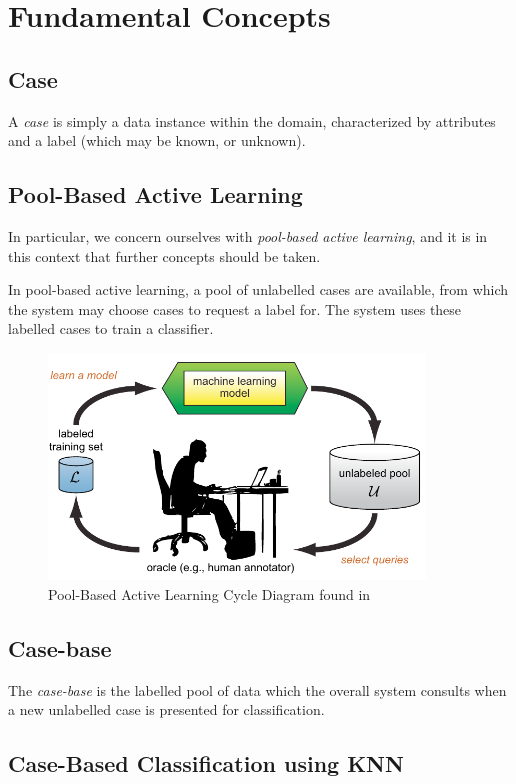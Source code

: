 \documentclass[a4paper,11pt]{report}
\begin{document}
\section{Fundamental Concepts}
\subsection{Case}
A \emph{case} is simply a data instance within the domain, characterized by attributes and a label (which may be known, or unknown).

\subsection{Pool-Based Active Learning}
In particular, we concern ourselves with \emph{pool-based active learning}, and it is in this context that further concepts should be taken.

In pool-based active learning, a pool of unlabelled cases are available, from which the system may choose cases to request a label for. The system uses these labelled cases to train a classifier.

\begin{figure}[h!] \centering
\includegraphics[width=10cm]{./Others/Settles2010PoolBasedImage}
\caption*{Pool-Based Active Learning Cycle Diagram found in \citet{Settles2010}}
\end{figure}

\subsection{Case-base}
The \emph{case-base} is the labelled pool of data which the overall system consults when a new unlabelled case is presented for classification.

\subsection{Case-Based Classification using KNN}
\end{document}
